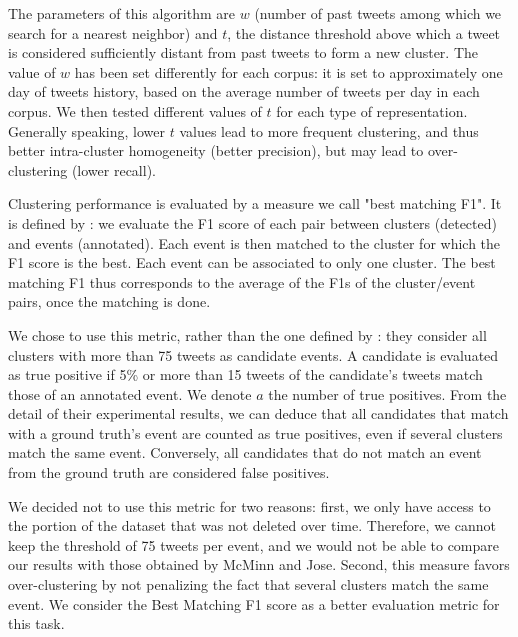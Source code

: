 The parameters of this algorithm are $w$ (number of past tweets among which we search for a nearest neighbor) and $t$, the distance threshold above which a tweet is considered sufficiently distant from past tweets to form a new cluster. The value of $w$ has been set differently for each corpus: it is set to approximately one day of tweets history, based on the average number of tweets per day in each corpus. We then tested different values of $t$ for each type of representation. Generally speaking, lower $t$ values lead to more frequent clustering, and thus better intra-cluster homogeneity (better precision), but may lead to over-clustering (lower recall).

Clustering performance is evaluated by a measure we call "best matching F1". It is defined by \citet{yang1998study}: we evaluate the F1 score of each pair between clusters (detected) and events (annotated). Each event is then matched to the cluster for which the F1 score is the best. Each event can be associated to only one cluster. The best matching F1 thus corresponds to the average of the F1s of the cluster/event pairs, once the matching is done.

We chose to use this metric, rather than the one defined by \citet{mcminn_real_2015}: they consider all clusters with more than 75 tweets as candidate events. A candidate is evaluated as true positive if 5\% or more than 15 tweets of the candidate's tweets match those of an annotated event. We denote $a$ the number of true positives. From the detail of their experimental results, we can deduce that all candidates that match with a ground truth's event are counted as true positives, even if several clusters match the same event. Conversely, all candidates that do not match an event from the ground truth are considered false positives. 

We decided not to use this metric for two reasons: first, we only have access to the portion of the \citet{mcminn_building_2013} dataset that was not deleted over time. Therefore, we cannot keep the threshold of 75 tweets per event, and we would not be able to compare our results with those obtained by McMinn and Jose. Second, this measure favors over-clustering by not penalizing the fact that several clusters match the same event. We consider the Best Matching F1 score as a better evaluation metric for this task.


